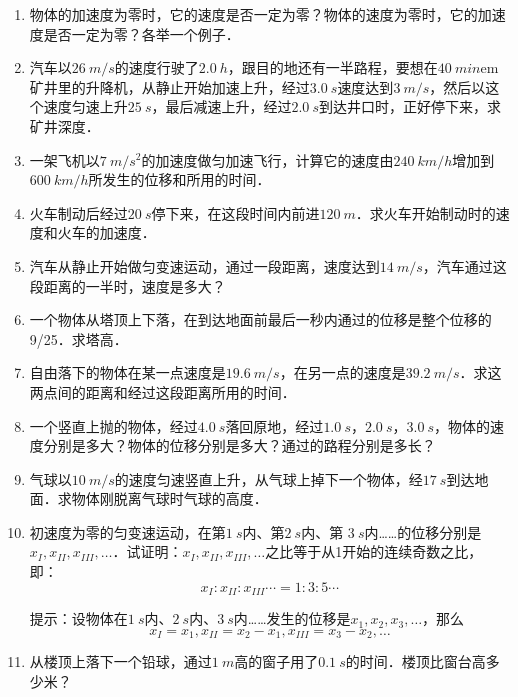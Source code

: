 \newpage

\begin{exercises}
\begin{enumerate}
    \item 物体的加速度为零时，它的速度是否一定为零？物体的速度为零时，它的加速度是否一定为零？各举一个例子．
    \item 汽车以$\qty{26}{m/s}$的速度行驶了$\qty{2.0}{h}$，跟目的地还有一半路程，要想在$\qty{40}{min}$em 矿井里的升降机，从静止开始加速上升，经过$\qty{3.0}{s}$速度达到$\qty{3}{m/s}$，然后以这个速度匀速上升$\qty{25}{s}$，最后减速上升，经过$\qty{2.0}{s}$到达井口时，正好停下来，求矿井深度．
    \item 一架飞机以$\qty{7}{m/s^2}$的加速度做匀加速飞行，计算它的速度由$\qty{240}{km/h}$增加到$\qty{600}{km/h}$所发生的位移和所用的时间．
    \item 火车制动后经过$\qty{20}{s}$停下来，在这段时间内前进$\qty{120}{m}$．求火车开始制动时的速度和火车的加速度．
    \item 汽车从静止开始做匀变速运动，通过一段距离，速度达到$\qty{14}{m/s}$，汽车通过这段距离的一半时，速度是多大？
    \item 一个物体从塔顶上下落，在到达地面前最后一秒内通过的位移是整个位移的9/25．求塔高．
    \item 自由落下的物体在某一点速度是$\qty{19.6}{m/s}$，在另一点的速度是$\qty{39.2}{m/s}$．求这两点间的距离和经过这段距离所用的时间．
    \item 一个竖直上抛的物体，经过$\qty{4.0}{s}$落回原地，经过$\qty{1.0}{s}$，$\qty{2.0}{s}$，$\qty{3.0}{s}$，物体的速度分别是多大？物体的位移分别是多大？通过的路程分别是多长？
    \item 气球以$\qty{10}{m/s}$的速度匀速竖直上升，从气球上掉下一个物体，经$\qty{17}{s}$到达地面．求物体刚脱离气球时气球的高度．
    \item 初速度为零的匀变速运动，在第$\qty{1}{s}$内、第$\qty{2}{s}$内、第
          $\qty{3}{s}$内……的位移分别是$x_I,x_{II},x_{III},\ldots$．试证明：$x_I,x_{II},x_{III},\ldots$之比等于从1开始的连续奇数之比，即：
          $$x_I:x_{II}:x_{III}\cdots=1:3:5\cdots$$

          提示：设物体在$\qty{1}{s}$内、$\qty{2}{s}$内、$\qty{3}{s}$内……发生的位移是$x_1,x_2,x_3,\ldots$，那么$$x_I=x_1, x_{II}=x_2-x_1, x_{III}=x_3-x_2,\ldots$$
    \item 从楼顶上落下一个铅球，通过$\qty{1}{m}$高的窗子用了$\qty{0.1}{s}$的时间．楼顶比窗台高多少米？
\end{enumerate}
\end{exercises}


































